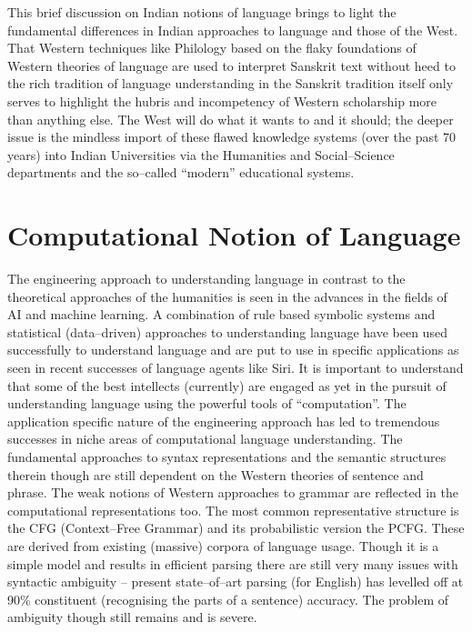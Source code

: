 This brief discussion on Indian notions of language brings to light the fundamental differences in Indian approaches to language and those of the West. That Western techniques like Philology based on the flaky foundations of Western theories of language are used to interpret Sanskrit text without heed to the rich tradition of language understanding in the Sanskrit tradition itself only serves to highlight the hubris and incompetency of Western scholarship more than anything else. The West will do what it wants to and it should; the deeper issue is the mindless import of these flawed knowledge systems (over the past 70 years) into Indian Universities via the Humanities and Social–Science departments and the so–called “modern” educational systems.


\section*{Computational Notion of Language}

\vskip -6pt

The engineering approach to understanding language in contrast to the theoretical approaches of the humanities is seen in the advances in the fields of AI and machine learning. A combination of rule based symbolic systems and statistical (data–driven) approaches to understanding language have been used successfully to understand language and are put to use in specific applications as seen in recent successes of language agents like Siri. It is important to understand that some of the best intellects (currently) are engaged as yet in the pursuit of understanding language using the powerful tools of “computation”. The application specific nature of the engineering approach has led to tremendous successes in niche areas of computational language understanding. The fundamental approaches to syntax representations and the semantic structures therein though are still dependent on the Western theories of sentence and phrase. The weak notions of Western approaches to grammar are reflected in the computational representations too. The most common representative structure is the CFG (Context–Free Grammar) and its probabilistic version the PCFG. These are derived from existing (massive) corpora of language usage. Though it is a simple model and results in efficient parsing there are still very many issues with syntactic ambiguity – present state–of–art parsing (for English) has levelled off at 90\% constituent (recognising the parts of a sentence) accuracy. The problem of ambiguity though still remains and is severe.

